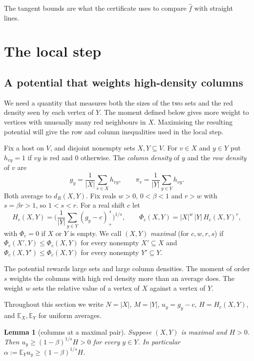 \documentclass[11pt]{article}
\newtheorem{lemma}[theorem]{Lemma}
\theoremstyle{definition}
\theoremstyle{remark}
\newcommand{\E}{\mathbb{E}}
\newcommand{\fh}{\widehat f}
\begin{document}
The tangent bounds are what the certificate uses to compare $\fh$ with straight lines.

\section{The local step}\label{sec:local}

\subsection{A potential that weights high-density columns}

We need a quantity that measures both the sizes of the two sets and the red density seen by each vertex of $Y$.
The moment defined below gives more weight to vertices with unusually many red neighbours in $X$.
Maximising the resulting potential will give the row and column inequalities used in the local step.

Fix a host on $V$, and disjoint nonempty sets $X,Y\subseteq V$. For $v\in X$ and $y\in Y$ put $h_{vy}=1$ if $vy$ is red
and $0$ otherwise. The \emph{column density} of $y$ and the \emph{row density} of $v$ are
\[
g_y=\frac1{|X|}\sum_{v\in X}h_{vy},\qquad \pi_v=\frac1{|Y|}\sum_{y\in Y}h_{vy}.
\]
Both average to $d_R(X,Y)$. Fix reals $w>0$, $0<\beta<1$ and $r>w$ with $s=\beta r>1$, so $1<s<r$. For a real shift
$c$ let
\[
H_c(X,Y)=\Big(\frac1{|Y|}\sum_{y\in Y}(g_y-c)_+^{\,s}\Big)^{1/s},\qquad \Phi_c(X,Y)=|X|^w\,|Y|\,H_c(X,Y)^r,
\]
with $\Phi_c=0$ if $X$ or $Y$ is empty. We call $(X,Y)$ \emph{maximal} (for $c,w,r,s$) if $\Phi_c(X',Y)\le\Phi_c(X,Y)$
for every nonempty $X'\subseteq X$ and $\Phi_c(X,Y')\le\Phi_c(X,Y)$ for every nonempty $Y'\subseteq Y$.

The potential rewards large sets and large column densities. The moment of order $s$ weights the columns with high
red density more than an average does. The weight $w$ sets the relative value of a vertex of $X$ against a vertex of
$Y$.

Throughout this section we write $N=|X|$, $M=|Y|$, $u_y=g_y-c$, $H=H_c(X,Y)$, and $\E_X,\E_Y$ for uniform averages.

\begin{lemma}[columns at a maximal pair]\label{lem:columns}
Suppose $(X,Y)$ is maximal and $H>0$. Then $u_y\ge(1-\beta)^{1/s}H>0$ for every $y\in Y$. In particular
$\alpha:=\E_Yu_y\ge(1-\beta)^{1/s}H$.
\end{lemma}
\end{document}
